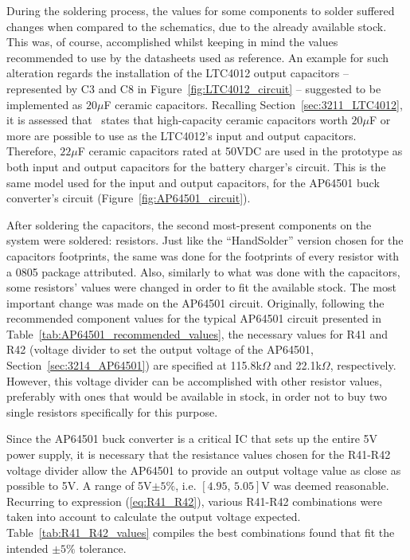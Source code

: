 During the soldering process, the values for some components to solder suffered changes when compared to the schematics, due to the already available stock. This was, of course, accomplished whilst keeping in mind the values recommended to use by the datasheets used as reference. An example for such alteration regards the installation of the LTC4012 output capacitors -- represented by C3 and C8 in Figure~\ref{fig:LTC4012_circuit} -- suggested to be implemented as $20 \mu$F ceramic capacitors. Recalling Section~\ref{sec:3211_LTC4012}, it is assessed that~\cite{LTC4012} states that high-capacity ceramic capacitors worth $20 \mu$F or more are possible to use as the LTC4012's input and output capacitors. Therefore, $22 \mu$F ceramic capacitors rated at 50VDC are used in the prototype as both input and output capacitors for the battery charger's circuit. This is the same model used for the input and output capacitors, for the AP64501 buck converter's circuit (Figure~\ref{fig:AP64501_circuit}).

After soldering the capacitors, the second most-present components on the system were soldered: resistors. Just like the ``HandSolder'' version chosen for the capacitors footprints, the same was done for the footprints of every resistor with a 0805 package attributed. Also, similarly to what was done with the capacitors, some resistors' values were changed in order to fit the available stock. The most important change was made on the AP64501 circuit.
Originally, following the recommended component values for the typical AP64501 circuit presented in Table~\ref{tab:AP64501_recommended_values}, the necessary values for R41 and R42 (voltage divider to set the output voltage of the AP64501, Section~\ref{sec:3214_AP64501}) are specified at 115.8k$\Omega$ and 22.1k$\Omega$, respectively. However, this voltage divider can be accomplished with other resistor values, preferably with ones that would be available in stock, in order not to buy two single resistors specifically for this purpose. 

Since the AP64501 buck converter is a critical IC that sets up the entire 5V power supply, it is necessary that the resistance values chosen for the R41-R42 voltage divider allow the AP64501 to provide an output voltage value as close as possible to 5V. A range of 5V$\pm 5\%$, i.e. $[4.95,\, 5.05]$V was deemed reasonable. Recurring to expression (\ref{eq:R41_R42}), various R41-R42 combinations were taken into account to calculate the output voltage expected. Table~\ref{tab:R41_R42_values} compiles the best combinations found that fit the intended $\pm 5\%$ tolerance.

